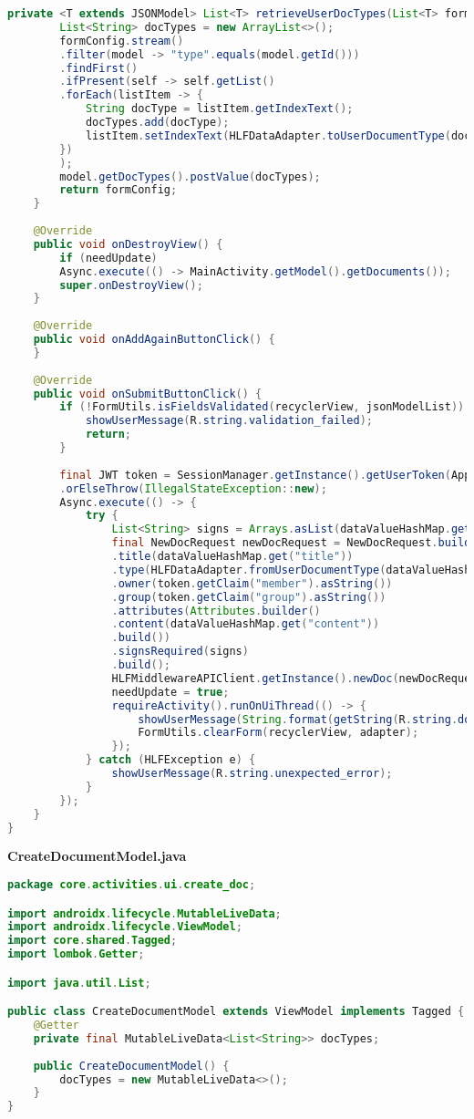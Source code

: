 \begin{lstlisting}[language=Java]
	private <T extends JSONModel> List<T> retrieveUserDocTypes(List<T> formConfig) {
		List<String> docTypes = new ArrayList<>();
		formConfig.stream()
		.filter(model -> "type".equals(model.getId()))
		.findFirst()
		.ifPresent(self -> self.getList()
		.forEach(listItem -> {
			String docType = listItem.getIndexText();
			docTypes.add(docType);
			listItem.setIndexText(HLFDataAdapter.toUserDocumentType(docType));
		})
		);
		model.getDocTypes().postValue(docTypes);
		return formConfig;
	}
	
	@Override
	public void onDestroyView() {
		if (needUpdate)
		Async.execute(() -> MainActivity.getModel().getDocuments());
		super.onDestroyView();
	}
	
	@Override
	public void onAddAgainButtonClick() {
	}
	
	@Override
	public void onSubmitButtonClick() {
		if (!FormUtils.isFieldsValidated(recyclerView, jsonModelList)) {
			showUserMessage(R.string.validation_failed);
			return;
		}
		
		final JWT token = SessionManager.getInstance().getUserToken(ApplicationContext.get())
		.orElseThrow(IllegalStateException::new);
		Async.execute(() -> {
			try {
				List<String> signs = Arrays.asList(dataValueHashMap.get("signs").split(","));
				final NewDocRequest newDocRequest = NewDocRequest.builder()
				.title(dataValueHashMap.get("title"))
				.type(HLFDataAdapter.fromUserDocumentType(dataValueHashMap.get("type")))
				.owner(token.getClaim("member").asString())
				.group(token.getClaim("group").asString())
				.attributes(Attributes.builder()
				.content(dataValueHashMap.get("content"))
				.build())
				.signsRequired(signs)
				.build();
				HLFMiddlewareAPIClient.getInstance().newDoc(newDocRequest, token.toString());
				needUpdate = true;
				requireActivity().runOnUiThread(() -> {
					showUserMessage(String.format(getString(R.string.doc_created_hint), dataValueHashMap.get("title")));
					FormUtils.clearForm(recyclerView, adapter);
				});
			} catch (HLFException e) {
				showUserMessage(R.string.unexpected_error);
			}
		});
	}
}	
\end{lstlisting}

\textbf{CreateDocumentModel.java}
\begin{lstlisting}[language=Java]
package core.activities.ui.create_doc;

import androidx.lifecycle.MutableLiveData;
import androidx.lifecycle.ViewModel;
import core.shared.Tagged;
import lombok.Getter;

import java.util.List;

public class CreateDocumentModel extends ViewModel implements Tagged {
	@Getter
	private final MutableLiveData<List<String>> docTypes;
	
	public CreateDocumentModel() {
		docTypes = new MutableLiveData<>();
	}
}	
\end{lstlisting}


